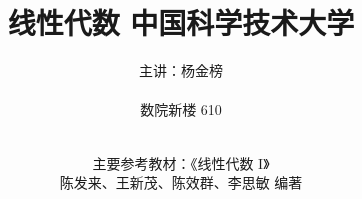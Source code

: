 \documentclass{beamer}
\begin{document}
\title{线性代数 \qquad 中国科学技术大学}
\author{\Large 主讲：杨金榜 \\ \ \\ 数院新楼 610}
\date{\mydate \\[16mm]
\small 主要参考教材：《线性代数 I》\\
陈发来、王新茂、陈效群、李思敏 编著}


\begin{frame}[plain]
\titlepage
\end{frame}













\end{document}
